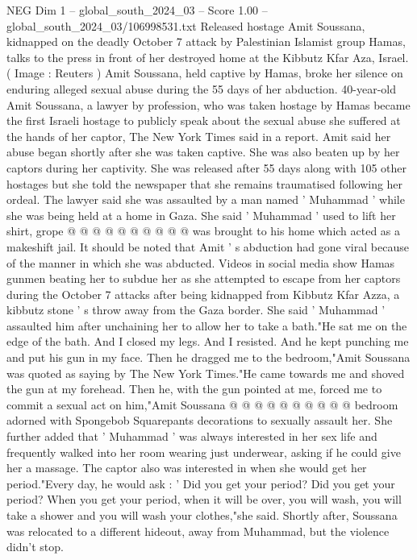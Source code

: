 \begin{textsample}{NEG Dim 1 – global\_south\_2024\_03 – Score 1.00 – global\_south\_2024\_03/106998531.txt}  \label{ex:f1_neg_430}
Released hostage Amit Soussana, kidnapped on the deadly October 7 attack by Palestinian Islamist group Hamas, talks to the press in front of her destroyed home at the Kibbutz Kfar Aza, Israel. ( Image : Reuters ) Amit Soussana, held captive by Hamas, broke her silence on enduring alleged sexual abuse during the 55 days of her abduction. 40-year-old Amit Soussana, a lawyer by profession, who was taken hostage by Hamas became the first Israeli hostage to publicly speak about the sexual abuse she suffered at the hands of her captor, The New York Times said in a report.
Amit said her abuse began shortly after she was taken captive.
She was also beaten up by her captors during her captivity.
She was released after 55 days along with 105 other hostages but she told the newspaper that she remains traumatised following her ordeal.
The lawyer said she was assaulted by a man named ' Muhammad ' while she was being held at a home in Gaza.
She said ' Muhammad ' used to lift her shirt, grope @ @ @ @ @ @ @ @ @ @ was brought to his home which acted as a makeshift jail.
It should be noted that Amit ' s abduction had gone viral because of the manner in which she was abducted.
Videos in social media show Hamas gunmen beating her to subdue her as she attempted to escape from her captors during the October 7 attacks after being kidnapped from Kibbutz Kfar Azza, a kibbutz stone ' s throw away from the Gaza border.
She said ' Muhammad ' assaulted him after unchaining her to allow her to take a bath."He sat me on the edge of the bath.
And I closed my legs.
And I resisted.
And he kept punching me and put his gun in my face.
Then he dragged me to the bedroom,"Amit Soussana was quoted as saying by The New York Times."He came towards me and shoved the gun at my forehead.
Then he, with the gun pointed at me, forced me to commit a sexual act on him,"Amit Soussana @ @ @ @ @ @ @ @ @ @ bedroom adorned with Spongebob Squarepants decorations to sexually assault her.
She further added that ' Muhammad ' was always interested in her sex life and frequently walked into her room wearing just underwear, asking if he could give her a massage.
The captor also was interested in when she would get her period."Every day, he would ask : ' Did you get your period?
Did you get your period?
When you get your period, when it will be over, you will wash, you will take a shower and you will wash your clothes,"she said.
Shortly after, Soussana was relocated to a different hideout, away from Muhammad, but the violence didn't stop.

\end{textsample}
